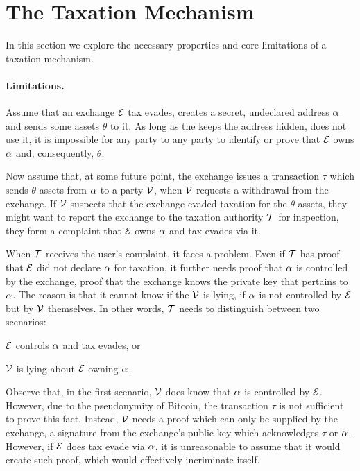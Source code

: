 \section{The Taxation Mechanism}\label{sec:taxation}

In this section we explore the necessary properties and core limitations of a
taxation mechanism.

\paragraph{Limitations.}

Assume that an exchange $\mathcal{E}$ tax evades, \ie creates a secret,
undeclared address $\alpha$ and sends some assets $\theta$ to it. As long as
the keeps the address hidden, \ie does not use it, it is impossible for any
party to any party to identify or prove that $\mathcal{E}$ owns $\alpha$ and,
consequently, $\theta$.

Now assume that, at some future point, the exchange issues a transaction $\tau$
which sends $\theta$ assets from $\alpha$ to a party $\mathcal{V}$, \eg when
$\mathcal{V}$ requests a withdrawal from the exchange. If $\mathcal{V}$ suspects that the
exchange evaded taxation for the $\theta$ assets, they might want to report the
exchange to the taxation authority $\mathcal{T}$ for inspection, \ie they form a
complaint that $\mathcal{E}$ owns $\alpha$ and tax evades via it.

When $\mathcal{T}$ receives the user's complaint, it faces a problem. Even if
$\mathcal{T}$ has proof that $\mathcal{E}$ did not declare $\alpha$ for taxation,
it further needs proof that $\alpha$ is controlled by the exchange, \ie proof
that the exchange knows the private key that pertains to $\alpha$. The reason
is that it cannot know if the $\mathcal{V}$ is lying, \ie if $\alpha$ is not
controlled by $\mathcal{E}$ but by $\mathcal{V}$ themselves. In other words, $\mathcal{T}$
needs to distinguish between two scenarios:
\begin{inparaenum}[i)]
    \item $\mathcal{E}$ controls $\alpha$ and tax evades, or
    \item $\mathcal{V}$ is lying about $\mathcal{E}$ owning $\alpha$.
\end{inparaenum}

Observe that, in the first scenario, $\mathcal{V}$ does know that $\alpha$ is
controlled by $\mathcal{E}$. However, due to the pseudonymity of Bitcoin, the
transaction $\tau$ is not sufficient to prove this fact. Instead, $\mathcal{V}$
needs a proof which can only be supplied by the exchange, \eg a signature from
the exchange's public key which acknowledges $\tau$ or $\alpha$. However, if
$\mathcal{E}$ does tax evade via $\alpha$, it is unreasonable to assume that it
would create such proof, which would effectively incriminate itself.

